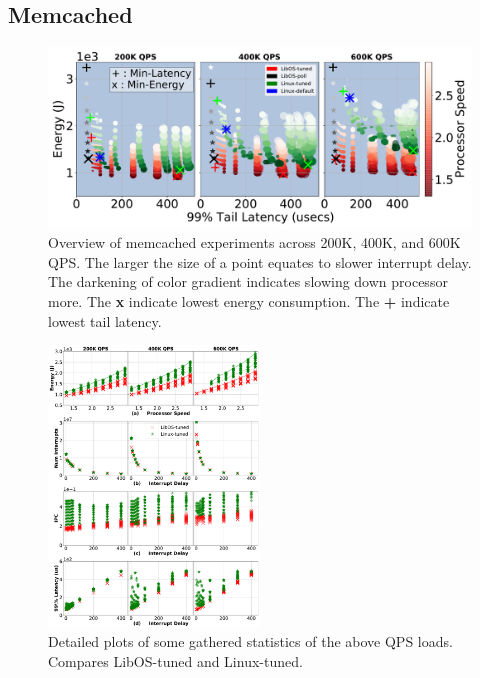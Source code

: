 \subsection{Memcached}
\label{sec:mcd}

\begin{figure}
\centering
\includegraphics[width=1\textwidth]{figures/mcd_overview}
\vspace*{-8mm}
\caption[]
{Overview of memcached experiments across 200K, 400K, and 600K QPS. The larger the size of a point equates to slower interrupt delay. The darkening of color gradient indicates slowing down processor more. The \textbf{x} indicate lowest energy consumption. The \textbf{+} indicate lowest tail latency.}
\label{fig:mcd_overview}
\end{figure}
\begin{figure}
\includegraphics[width=0.5\textwidth]{figures/mcd_detail_1}
\vspace*{-8mm}
\caption[]{Detailed plots of some gathered statistics of the above QPS loads. Compares LibOS-tuned and Linux-tuned.}
\label{fig:mcd_detail_1}
\end{figure}
